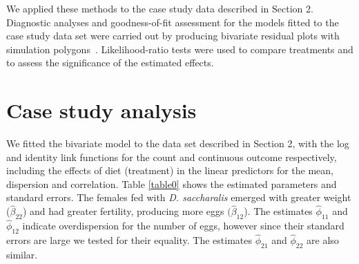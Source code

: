 \documentclass[useAMS,referee]{biom}
\begin{document}
We applied these methods to the case study data described in Section 2. Diagnostic analyses and goodness-of-fit assessment for the models fitted to the case study data set were carried out by producing bivariate residual plots with simulation polygons~\citep{moral2020bivariate}. Likelihood-ratio tests were used to compare treatments and to assess the significance of the estimated effects.



\section{Case study analysis}


We fitted the bivariate model to the data set described in Section 2, with the log and identity link functions for the count and continuous outcome respectively, including the effects of diet (treatment) in the linear predictors for the mean, dispersion and correlation. Table \ref{table0} shows the estimated parameters and standard errors. The females fed with \textit{D. saccharalis} emerged with greater weight ($\hat\beta_{22}$) and had greater fertility, producing more eggs $(\hat\beta_{12}$). The estimates $\hat\phi_{11}$ and $\hat\phi_{12}$ indicate overdispersion for the number of eggs,  however since their standard errors are large we tested for their equality. The estimates $\hat\phi_{21}$ and $\hat\phi_{22}$ are also similar.
\end{document}
